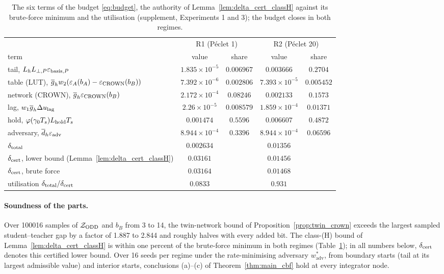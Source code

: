 \begin{table}[t]
{\caption{The six terms of the budget \eqref{eq:budget}, the authority of Lemma~\ref{lem:delta_cert_classH} against its brute-force minimum and the utilisation (supplement, Experiments 1 and 3); the budget closes in both regimes.}\label{tab:budget}}
{\scriptsize
\begin{tabular}{lcccc}
\toprule
& \multicolumn{2}{c}{R1 (P\'eclet 1)} & \multicolumn{2}{c}{R2 (P\'eclet 20)} \\
term & value & share & value & share \\
\midrule
tail, $L_hL_{\perp,P}\varepsilon_{\mathrm{basis},P}$ & $1.835\times10^{-5}$ & $0.006967$ & $0.003666$ & $0.2704$ \\
table (LUT), $\overline{g}_h w_2(\varepsilon_A(b_A) - \varepsilon_{\mathrm{CROWN}}(b_B))$ & $7.392\times10^{-6}$ & $0.002806$ & $7.393\times10^{-5}$ & $0.005452$ \\
network (CROWN), $\overline{g}_h\varepsilon_{\mathrm{CROWN}}(b_B)$ & $2.172\times10^{-4}$ & $0.08246$ & $0.002133$ & $0.1573$ \\
lag, $w_1\overline{g}_h\Delta u_{\mathrm{lag}}$ & $2.26\times10^{-5}$ & $0.008579$ & $1.859\times10^{-4}$ & $0.01371$ \\
hold, $\varphi(\gamma_0T_s)L_{\mathrm{hold}} T_s$ & $0.001474$ & $0.5596$ & $0.006607$ & $0.4872$ \\
adversary, $\overline{d}_h\varepsilon_{\mathrm{adv}}$ & $8.944\times10^{-4}$ & $0.3396$ & $8.944\times10^{-4}$ & $0.06596$ \\
\midrule
$\delta_{\mathrm{total}}$ & $0.002634$ & & $0.01356$ & \\
$\delta_{\mathrm{cert}}$, lower bound (Lemma~\ref{lem:delta_cert_classH}) & $0.03161$ & & $0.01456$ & \\
$\delta_{\mathrm{cert}}$, brute force & $0.03164$ & & $0.01468$ & \\
utilisation $\delta_{\mathrm{total}}/\delta_{\mathrm{cert}}$ & $0.0833$ & & $0.931$ & \\
\bottomrule
\end{tabular}}
\end{table}

\paragraph{Soundness of the parts.}
Over 100016 samples of $\mathcal{Z}_{\mathrm{ODD}}$ and $b_B$ from 3 to 14, the twin-network bound of Proposition~\ref{prop:twin_crown} exceeds the largest sampled student--teacher gap by a factor of 1.887 to 2.844 and roughly halves with every added bit. The class-(H) bound of Lemma~\ref{lem:delta_cert_classH} is within one percent of the brute-force minimum in both regimes (Table~\ref{tab:budget}); in all numbers below, $\delta_{\mathrm{cert}}$ denotes this certified lower bound. Over 16 seeds per regime under the rate-minimising adversary $w^*_{\mathrm{adv}}$, from boundary starts (tail at its largest admissible value) and interior starts, conclusions (a)--(c) of Theorem~\ref{thm:main_cbf} hold at every integrator node.

